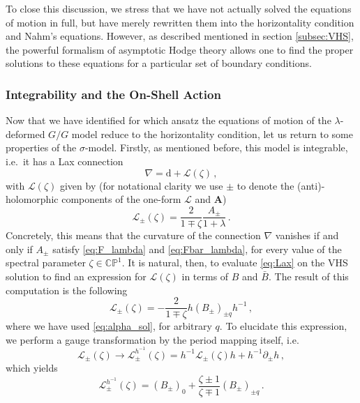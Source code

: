 \documentclass[11pt,a4paper]{article}
\numberwithin{equation}{section}
\numberwithin{table}{section}\setlength{\multlinegap}{25pt}
\newcommand{\dd}{\mathrm{d}}
\begin{document}
To close this discussion, we stress that we have not actually solved the equations of motion in full, but have merely rewritten them into the horizontality condition and Nahm's equations. However, as described mentioned in section \ref{subsec:VHS}, the powerful formalism of asymptotic Hodge theory allows one to find the proper solutions to these equations for a particular set of boundary conditions.

\subsubsection{Integrability and the On-Shell Action}

Now that we have identified for which ansatz the equations of motion of the $\lambda$-deformed $G/G$ model reduce to the horizontality condition, let us return to some properties of the $\sigma$-model. Firstly, as mentioned before, this model is integrable, i.e.~it has a Lax connection 
\begin{equation}
	\nabla = \dd +\mathcal{L}(\zeta)\,,
\end{equation}
with $\mathcal{L}(\zeta)$ given by (for notational clarity we use $\pm$ to denote the (anti)-holomorphic components of the one-form $\mathcal{L}$ and $\mathbf{A}$)
\begin{equation}\label{eq:Lax}
	\mathcal{L}_\pm(\zeta)=\frac{2}{1\mp \zeta} \frac{A_{\pm}}{1+\lambda}\,.
\end{equation}
Concretely, this means that the curvature of the connection $\nabla$ vanishes if and only if $A_\pm$ satisfy \eqref{eq:F_lambda} and \eqref{eq:Fbar_lambda}, for every value of the spectral parameter $\zeta\in\mathbb{C}\mathbb{P}^1$. It is natural, then, to evaluate \eqref{eq:Lax} on the VHS solution to find an expression for $\mathcal{L}(\zeta)$ in terms of $B$ and $\bar{B}$. The result of this computation is the following
\begin{equation}
	\mathcal{L}_\pm(\zeta) = -\frac{2}{1\mp\zeta} h \left(B_{\pm}\right)_{\pm q}h^{-1}\,,
\end{equation}
where we have used \eqref{eq:alpha_sol}, for arbitrary $q$. To elucidate this expression, we perform a gauge transformation by the period mapping itself, i.e.
\begin{equation}
	\mathcal{L}_\pm(\zeta)\rightarrow \mathcal{L}_{\pm}^{h^{-1}}(\zeta) = h^{-1}\mathcal{L}_{\pm}(\zeta)h + h^{-1}\partial_\pm h\,,
\end{equation} 
which yields
\begin{equation}\label{eq:Lax_gauge_transform}
	\mathcal{L}^{h^{-1}}_\pm(\zeta) = (B_\pm)_0 + \frac{\zeta\pm 1}{\zeta\mp 1} (B_{\pm})_{\pm q}\,.
\end{equation}
\end{document}
